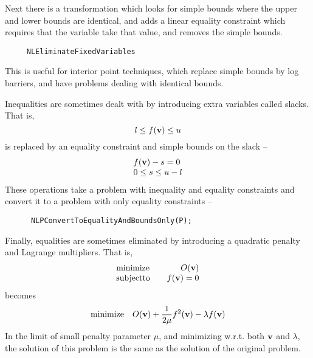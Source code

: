 \documentclass[12pt]{article}
\begin{document}
    Next there is a transformation which looks for simple bounds where the upper and lower bounds are
    identical, and adds a linear equality constraint which requires that the variable take that value, 
    and removes the simple bounds.
    \begin{verbatim}
     NLEliminateFixedVariables
    \end{verbatim}
    This is useful for interior point techniques, which replace simple bounds by log barriers, and have
    problems dealing with identical bounds.

    Inequalities are sometimes dealt with by introducing extra variables called slacks. That is,
    \begin{displaymath}
      l\leq f({\bf v})\leq u
    \end{displaymath}
    is replaced by an equality constraint and simple bounds on the slack --
    \begin{displaymath}
    \begin{array}{l}
      \displaystyle f({\bf v})-s =0 \\
      \displaystyle 0\leq s \leq u-l\\
    \end{array}
    \end{displaymath}
    These operations take a problem with inequality and equality constraints and convert it to a problem
    with only equality constraints --
    \begin{verbatim}
      NLPConvertToEqualityAndBoundsOnly(P);
    \end{verbatim}

    Finally, equalities are sometimes eliminated by introducing a quadratic penalty and Lagrange multipliers.
    That is, 
    \begin{displaymath}
    \begin{array}{lr}
      \displaystyle {\rm minimize}&\displaystyle\quad O({\bf v}) \\
      \displaystyle {\rm subject to}& \displaystyle\quad f({\bf v})=0\\
    \end{array}
    \end{displaymath}
    becomes
    \begin{displaymath}
      {\rm minimize}\quad O({\bf v}) + {1\over{2\mu}}f^2({\bf v})-\lambda f({\bf v})
    \end{displaymath}
    In the limit of small penalty parameter $\mu$, and minimizing w.r.t. both ${\bf v}$ and $\lambda$, the
    solution of this problem is the same as the solution of the original problem.
\end{document}
